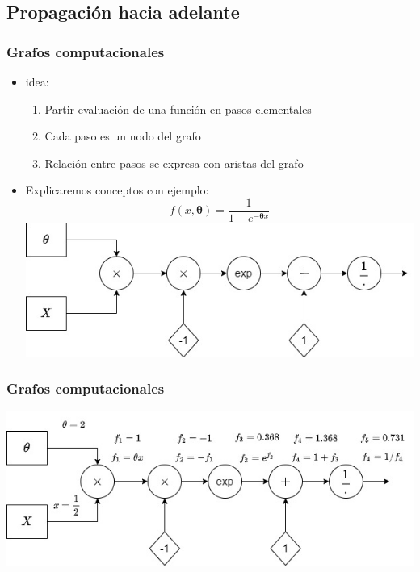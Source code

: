 \documentclass{beamer}
\begin{document}
\subsection{Propagación hacia adelante}
\begin{frame}
\frametitle{Grafos computacionales}
\begin{itemize}
\item idea:
\begin{enumerate}
\item Partir evaluación de una función en pasos elementales
\item Cada paso es un nodo del grafo
\item Relación entre pasos se expresa con aristas del grafo
\end{enumerate}
\item Explicaremos conceptos con ejemplo:
\begin{equation*}
f(x,\boldsymbol{\theta})=\frac{1}{1+e^{-\boldsymbol{\theta} x}}
\end{equation*}
\includegraphics[scale=0.4]{im1}
\end{itemize}
\end{frame}
\begin{frame}
\frametitle{Grafos computacionales}
\includegraphics[scale=0.4]{im2}
\end{frame}
\end{document}
